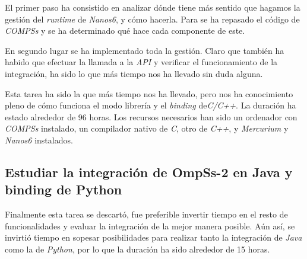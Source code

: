 El primer paso ha consistido en analizar dónde tiene más sentido que hagamos la gestión del \textit{runtime} de \textit{Nanos6}, y cómo hacerla. Para se ha repasado el código de \textit{COMPSs} y se ha determinado qué hace cada componente de este. 

En segundo lugar se ha implementado toda la gestión. Claro que también ha habido que efectuar la llamada a la \textit{API} y verificar el funcionamiento de la integración, ha sido lo que más tiempo nos ha llevado sin duda alguna.

Esta tarea ha sido la que más tiempo nos ha llevado, pero nos ha conocimiento pleno de cómo funciona el modo librería y el \textit{binding} de\textit{C/C++}. La duración ha estado alrededor de 96 horas. Los recursos necesarios han sido un ordenador con \textit{COMPSs} instalado, un compilador nativo de \textit{C}, otro de \textit{C++}, y \textit{Mercurium} y \textit{Nanos6} instalados.

\subsection{Estudiar la integración de OmpSs-2 en Java y binding de Python}

\begin{comment}
En caso de que la primera integración haya funcionado, se estudiará la posibilidad de hacer lo mismo con \textit{Java} y el \textit{binding} de \textit{Python}. Consistirá exactamente de los mismos pasos, y puede ayudar a mejorar la implementación anterior. La duración estimada de esta tarea dependerá de si se decide realizar o no esta actividad. Mínimo se emplearán 15 horas en el estudio preliminar, y en caso de realizar la integración, 78 horas más, es decir, 15 horas o bien 93 horas. Pese a que la tarea es muy similar a la anterior, el tiempo previsto es algo menor por el hecho de que ya se ha podido realizar una integración y la implementación debería ser parecida. Los recursos necesarios son un ordenador con \textit{COMPSs} instalado, un compilador nativo de \textit{C}, otro de \textit{C++}, y \textit{Mercurium} y \textit{Nanos6} instalados.
\end{comment}

Finalmente esta tarea se descartó, fue preferible invertir tiempo en el resto de funcionalidades y evaluar la integración de la mejor manera posible. Aún así, se invirtió tiempo en sopesar posibilidades para realizar tanto la integración de \textit{Java} como la de \textit{Python}, por lo que la duración ha sido alrededor de 15 horas.

